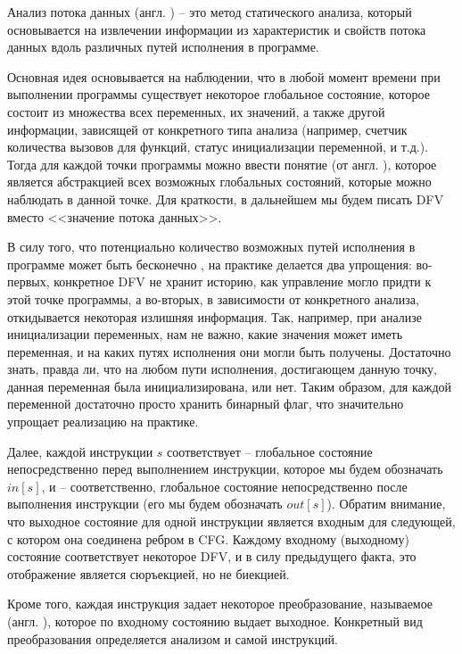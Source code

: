 \begin{definition}
	Анализ потока данных (англ. )  -- это метод статического анализа, который основывается на извлечении информации из характеристик и свойств потока данных вдоль различных путей исполнения в программе.
\end{definition}

Основная идея основывается на наблюдении, что в любой момент времени при выполнении программы существует некоторое глобальное состояние, которое состоит из множества всех переменных, их значений, а также другой информации, зависящей от конкретного типа анализа (например, счетчик количества вызовов для функций, статус инициализации переменной, и т.д.). Тогда для каждой точки программы можно ввести понятие  (от англ. ), которое является абстракцией всех возможных глобальных состояний, которые можно наблюдать в данной точке. Для краткости, в дальнейшем мы будем писать DFV вместо <<значение потока данных>>.

В силу того, что потенциально количество возможных путей исполнения в программе может быть бесконечно \cite{dragon-book}, на практике делается два упрощения: во-первых, конкретное DFV не хранит историю, как управление могло придти к этой точке программы, а во-вторых, в зависимости от конкретного анализа, откидывается некоторая излишняя информация. Так, например, при анализе инициализации переменных, нам не важно, какие значения может иметь переменная, и на каких путях исполнения они могли быть получены. Достаточно знать, правда ли, что на любом пути исполнения, достигающем данную точку, данная переменная была инициализирована, или нет. Таким образом, для каждой переменной достаточно просто хранить бинарный флаг, что значительно упрощает реализацию на практике.

Далее, каждой инструкции $s$ соответствует  -- глобальное состояние непосредственно перед выполнением инструкции, которое мы будем обозначать $in[s]$, и  -- соответственно, глобальное состояние непосредственно после выполнения инструкции (его мы будем обозначать $out[s]$). Обратим внимание, что выходное состояние для одной инструкции является входным для следующей, с котором она соединена ребром в CFG. Каждому входному (выходному) состояние соответствует некоторое DFV, и в силу предыдущего факта, это отображение является сюръекцией, но не биекцией.

Кроме того, каждая инструкция задает некоторое преобразование, называемое  (англ. ), которое по входному состоянию выдает выходное. Конкретный вид преобразования определяется анализом и самой инструкций. 

